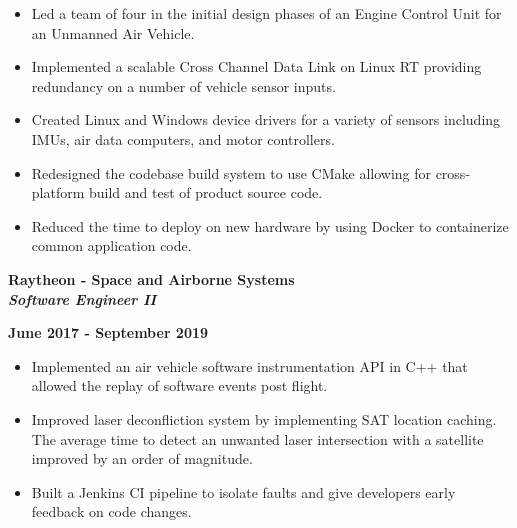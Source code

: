 \documentclass[10pt,letterpaper]{article}
\begin{document}
\begin{itemize}[noitemsep,topsep=0pt]
    \setlength\itemsep{0.2em}
    \item Led a team of four in the initial design phases of an Engine Control
          Unit for an Unmanned Air Vehicle.
    \item Implemented a scalable Cross Channel Data Link on Linux RT providing
          redundancy on a number of vehicle sensor inputs.
    \item Created Linux and Windows device drivers for a variety of sensors
          including IMUs, air data computers, and motor controllers.
    \item Redesigned the codebase build system to use CMake allowing for
          cross-platform build and test of product source code.
    \item Reduced the time to deploy on new hardware by using Docker to
          containerize common application code.
\end{itemize}

\medskip

\begin{minipage}[t]{0.53\textwidth}
    \begin{flushleft}
        \textbf{Raytheon - Space and Airborne Systems}\\
        \textbf{\textit{Software Engineer II}}\\
    \end{flushleft}
\end{minipage}
\begin{minipage}[t]{0.44\textwidth}
    \begin{flushright}
        \textbf{June 2017 - September 2019}
    \end{flushright}
\end{minipage}

\begin{itemize}[noitemsep,topsep=0pt]
    \setlength\itemsep{0.2em}
    \item Implemented an air vehicle software instrumentation API in C++
          that allowed the replay of software events post flight.
    \item Improved laser deconfliction system by implementing SAT location
          caching. The average time to detect an unwanted laser intersection
          with a satellite improved by an order of magnitude.
    \item Built a Jenkins CI pipeline to isolate faults and give developers
          early feedback on code changes.
\end{itemize}
\end{document}
